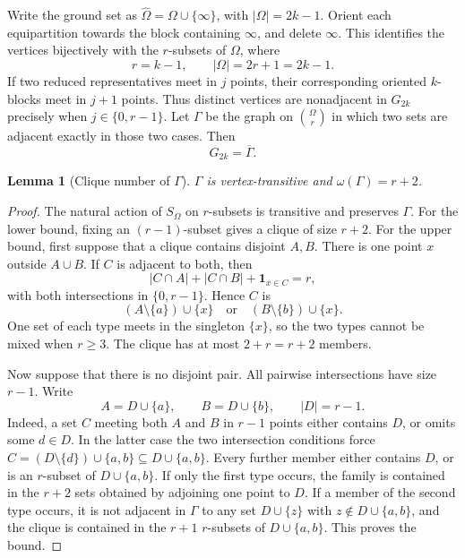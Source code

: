 \documentclass[11pt]{article}
\newtheorem{lemma}[theorem]{Lemma}
\begin{document}
Write the ground set as
\(\widehat\Omega=\Omega\cup\{\infty\}\), with \(|\Omega|=2k-1\).  Orient
each equipartition towards the block containing \(\infty\), and delete
\(\infty\).  This identifies the vertices bijectively with the \(r\)-subsets
of \(\Omega\), where
\[
r=k-1,\qquad |\Omega|=2r+1=2k-1.
\]
If two reduced representatives meet in \(j\) points, their corresponding
oriented \(k\)-blocks meet in \(j+1\) points.  Thus distinct vertices are
nonadjacent in \(G_{2k}\) precisely when \(j\in\{0,r-1\}\).  Let \(\Gamma\)
be the graph on \(\binom{\Omega}{r}\) in which two sets are adjacent exactly
in those two cases.
Then
\[
G_{2k}=\overline{\Gamma}.
\]

\begin{lemma}[Clique number of \(\Gamma\)]\label{lem:gamma-clique}
\(\Gamma\) is vertex-transitive and \(\omega(\Gamma)=r+2\).
\end{lemma}

\begin{proof}
The natural action of \(S_{\Omega}\) on \(r\)-subsets is transitive and
preserves \(\Gamma\).  For the lower bound, fixing an \((r-1)\)-subset gives
a clique of size \(r+2\).  For the upper
bound, first suppose that a clique contains disjoint \(A,B\).  There is one
point \(x\) outside \(A\cup B\).  If \(C\) is adjacent to both, then
\[
|C\cap A|+|C\cap B|+\boldsymbol{1}_{x\in C}=r,
\]
with both intersections in \(\{0,r-1\}\).  Hence \(C\) is
\[
(A\setminus\{a\})\cup\{x\}
\quad\text{or}\quad
(B\setminus\{b\})\cup\{x\}.
\]
One set of each type meets in the singleton \(\{x\}\), so the two types
cannot be mixed when \(r\ge3\).  The clique has at most \(2+r=r+2\)
members.

Now suppose that there is no disjoint pair.  All pairwise intersections
have size \(r-1\).  Write
\[
A=D\cup\{a\},\qquad B=D\cup\{b\},\qquad |D|=r-1.
\]
Indeed, a set \(C\) meeting both \(A\) and \(B\) in \(r-1\) points either
contains \(D\), or omits some \(d\in D\).  In the latter case the two
intersection conditions force
\(C=(D\setminus\{d\})\cup\{a,b\}\subseteq D\cup\{a,b\}\).
Every further member either contains \(D\), or is an \(r\)-subset of
\(D\cup\{a,b\}\).  If only the first type occurs, the family is contained
in the \(r+2\) sets obtained by adjoining one point to \(D\).  If a member of
the second type occurs, it is not adjacent in \(\Gamma\) to any set
\(D\cup\{z\}\) with \(z\notin D\cup\{a,b\}\), and the clique is contained in
the \(r+1\) \(r\)-subsets of \(D\cup\{a,b\}\).  This proves the bound.
\end{proof}
\end{document}
